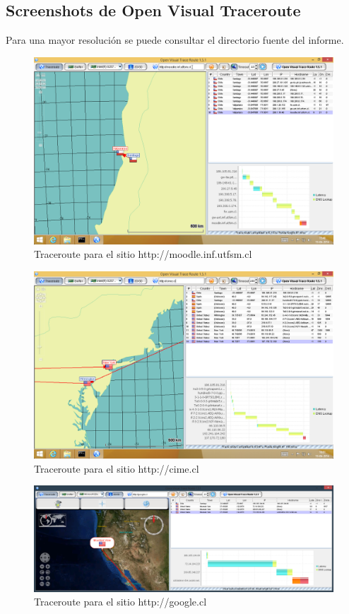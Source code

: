 \documentclass{article}
\begin{document}
\subsection{Screenshots de Open Visual Traceroute}
Para una mayor resolución se puede consultar el directorio fuente del informe.
\begin{figure}[H]
    \centering
    \includegraphics[scale=0.27]{mudul}
    \caption{Traceroute para el sitio http://moodle.inf.utfsm.cl}
\end{figure}

\begin{figure}[H]
    \centering
    \includegraphics[scale=0.27]{cime}
    \caption{Traceroute para el sitio http://cime.cl}
\end{figure}

\begin{figure}[H]
    \centering
    \includegraphics[scale=0.24]{gugl}
    \caption{Traceroute para el sitio http://google.cl}
\end{figure}
\end{document}
